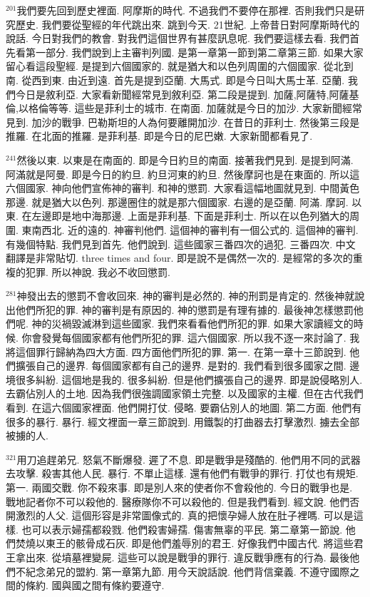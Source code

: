 \documentclass{book}
\begin{document}
$^{201}$我們要先回到歷史裡面.
阿摩斯的時代.
不過我們不要停在那裡.
否則我們只是研究歷史.
我們要從聖經的年代跳出來.
跳到今天.
21世紀.
上帝昔日對阿摩斯時代的說話.
今日對我們的教會.
對我們這個世界有甚麼訊息呢.
我們要這樣去看.
我們首先看第一部分.
我們說到上主審判列國.
是第一章第一節到第二章第三節.
如果大家留心看這段聖經.
是提到六個國家的.
就是猶大和以色列周圍的六個國家.
從北到南.
從西到東.
由近到遠.
首先是提到亞蘭.
大馬式.
即是今日叫大馬士革.
亞蘭.
我們今日是敘利亞.
大家看新聞經常見到敘利亞.
第二段是提到.
加薩,阿薩特,阿薩基倫,以格倫等等.
這些是菲利士的城市.
在南面.
加薩就是今日的加沙.
大家新聞經常見到.
加沙的戰爭.
巴勒斯坦的人為何要離開加沙.
在昔日的菲利士.
然後第三段是推羅.
在北面的推羅.
是菲利基.
即是今日的尼巴嫩.
大家新聞都看見了.

$^{241}$然後以東.
以東是在南面的.
即是今日約旦的南面.
接著我們見到.
是提到阿滿.
阿滿就是阿曼.
即是今日的約旦.
約旦河東的約旦.
然後摩訶也是在東面的.
所以這六個國家.
神向他們宣佈神的審判.
和神的懲罰.
大家看這幅地圖就見到.
中間黃色那邊.
就是猶大以色列.
那邊圈住的就是那六個國家.
右邊的是亞蘭.
阿滿.
摩訶.
以東.
在左邊即是地中海那邊.
上面是菲利基.
下面是菲利士.
所以在以色列猶大的周圍.
東南西北.
近的遠的.
神審判他們.
這個神的審判有一個公式的.
這個神的審判.
有幾個特點.
我們見到首先.
他們說到.
這些國家三番四次的過犯.
三番四次.
中文翻譯是非常貼切.
three times and four.
即是說不是偶然一次的.
是經常的多次的重複的犯罪.
所以神說.
我必不收回懲罰.

$^{281}$神發出去的懲罰不會收回來.
神的審判是必然的.
神的刑罰是肯定的.
然後神就說出他們所犯的罪.
神的審判是有原因的.
神的懲罰是有理有據的.
最後神怎樣懲罰他們呢.
神的災禍毀滅淋到這些國家.
我們來看看他們所犯的罪.
如果大家讀經文的時候.
你會發覺每個國家都有他們所犯的罪.
這六個國家.
所以我不逐一來討論了.
我將這個罪行歸納為四大方面.
四方面他們所犯的罪.
第一.
在第一章十三節說到.
他們擴張自己的邊界.
每個國家都有自己的邊界.
是對的.
我們看到很多國家之間.
邊境很多糾紛.
這個地是我的.
很多糾紛.
但是他們擴張自己的邊界.
即是說侵略別人.
去霸佔別人的土地.
因為我們很強調國家領土完整.
以及國家的主權.
但在古代我們看到.
在這六個國家裡面.
他們開打仗.
侵略.
要霸佔別人的地圖.
第二方面.
他們有很多的暴行.
暴行.
經文裡面一章三節說到.
用鐵製的打曲器去打擊激烈.
擄去全部被擄的人.

$^{321}$用刀追趕弟兄.
怒氣不斷爆發.
遲了不息.
即是戰爭是殘酷的.
他們用不同的武器去攻擊.
殺害其他人民.
暴行.
不單止這樣.
還有他們有戰爭的罪行.
打仗也有規矩.
第一.
兩國交戰.
你不殺來事.
即是別人來的使者你不會殺他的.
今日的戰爭也是.
戰地記者你不可以殺他的.
醫療隊你不可以殺他的.
但是我們看到.
經文說.
他們否開激烈的人父.
這個形容是非常圖像式的.
真的把懷孕婦人放在肚子裡嗎.
可以是這樣.
也可以表示婦孺都殺戮.
他們殺害婦孺.
傷害無辜的平民.
第二章第一節說.
他們焚燒以東王的骸骨成石灰.
即是他們羞辱別的君王.
好像我們中國古代.
將這些君王拿出來.
從墳墓裡變屍.
這些可以說是戰爭的罪行.
違反戰爭應有的行為.
最後他們不紀念弟兄的盟約.
第一章第九節.
用今天說話說.
他們背信棄義.
不遵守國際之間的條約.
國與國之間有條約要遵守.
\end{document}
